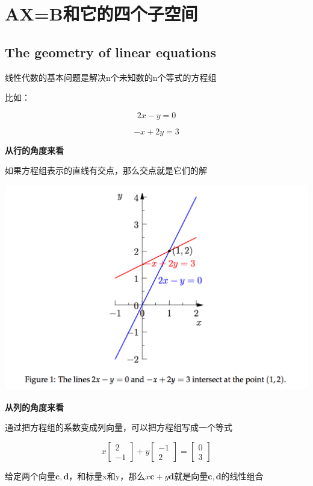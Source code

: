 \documentclass{ctexart}
\begin{document}
	\section{AX=B和它的四个子空间}
	
	\subsection{The geometry of linear equations}
	
	线性代数的基本问题是解决n个未知数的n个等式的方程组
	
	比如：
	
	\[2x − y = 0\]
	
	\[−x + 2y = 3\]
	
	\textbf{从行的角度来看}
	
	如果方程组表示的直线有交点，那么交点就是它们的解
	
	\begin{center}
		\includegraphics[width=0.8\linewidth]{pic/plot_two_equation}
	\end{center}

	\textbf{从列的角度来看}
	
	通过把方程组的系数变成列向量，可以把方程组写成一个等式
	
	\[x\begin{bmatrix}
	2 \\ -1 
	\end{bmatrix}+ 
	y\begin{bmatrix}
	-1 \\ 2
	\end{bmatrix} = 
	\begin{bmatrix}
	0 \\ 3
	\end{bmatrix}\]
	
	给定两个向量\(\bm{c}, \bm{d}\)，和标量x和y，那么\(x\bm{c}+y\bm{d}\)就是向量\(\bm{c}, \bm{d}\)的线性组合
	
\end{document}
